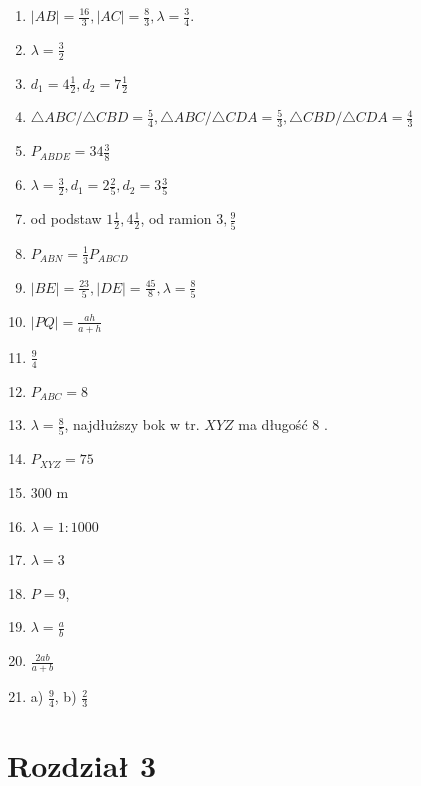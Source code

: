 \documentclass[10pt]{article}
\begin{document}
\begin{enumerate}
  \item \(|A B|=\frac{16}{3},|A C|=\frac{8}{3}, \lambda=\frac{3}{4}\).
  \item \(\lambda=\frac{3}{2}\)
  \item \(d_{1}=4 \frac{1}{2}, d_{2}=7 \frac{1}{2}\)
  \item \(\triangle A B C / \triangle C B D=\frac{5}{4}, \triangle A B C / \triangle C D A=\frac{5}{3}, \triangle C B D / \triangle C D A=\frac{4}{3}\)
  \item \(P_{A B D E}=34 \frac{3}{8}\)
  \item \(\lambda=\frac{3}{2}, d_{1}=2 \frac{2}{5}, d_{2}=3 \frac{3}{5}\)
  \item od podstaw \(1 \frac{1}{2}, 4 \frac{1}{2}\), od ramion \(3, \frac{9}{5}\)
  \item \(P_{A B N}=\frac{1}{3} P_{A B C D}\)
  \item \(|B E|=\frac{23}{5},|D E|=\frac{45}{8}, \lambda=\frac{8}{5}\)
  \item \(|P Q|=\frac{a h}{a+h}\)
  \item \(\frac{9}{4}\)
  \item \(P_{A B C}=8\)
  \item \(\lambda=\frac{8}{5}\), najdłuższy bok w tr. \(X Y Z\) ma długość 8 .
  \item \(P_{X Y Z}=75\)
  \item 300 m
  \item \(\lambda=1: 1000\)
  \item \(\lambda=3\)
  \item \(P=9\),
  \item \(\lambda=\frac{a}{b}\)
  \item \(\frac{2 a b}{a+b}\)
  \item a) \(\frac{9}{4}\), b) \(\frac{2}{3}\)
\end{enumerate}

\section*{Rozdział 3}
\end{document}
